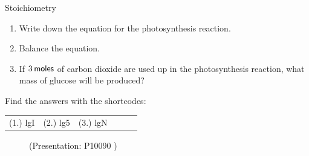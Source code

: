 \begin{exercises}{  Stoichiometry
      }
\begin{enumerate}[noitemsep, label=\textbf{\arabic*}. ]
\begin{enumerate}[noitemsep, label=\textbf{\alph*}. ]
            \label{m38712*uid104}\item Write down the equation for the photosynthesis reaction.
\label{m38712*uid105}\item Balance the equation.
\label{m38712*uid106}\item If $3\phantom{\rule{2pt}{0ex}}\mathsf{moles}$ of carbon dioxide are used up in the photosynthesis reaction, what mass of glucose will be produced?
\end{enumerate}
                \end{enumerate}
 \label{m38712*cid10}
\par {} Find the answers with the shortcodes:
 \par \begin{tabular}[h]{cccccc}
 (1.) lgI  &  (2.) lg5  &  (3.) lgN  & \end{tabular}
\end{exercises}

    \label{m38712*eip-269} 
    \setcounter{subfigure}{0}
	\begin{figure}[H] %
    \label{m38712*slidesharemedia}\label{m38712*slideshareflash}
             { (Presentation:  P10090 )}
 \end{figure}       \par
\vspace{-2cm}
